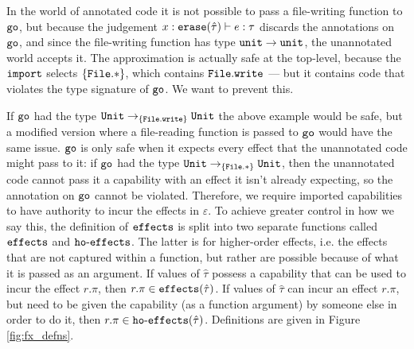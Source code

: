 In the world of annotated code it is not possible to pass a
file-writing function to $\mathtt{go}$, but because the judgement
$x: \mathtt{erase}(\hat \tau) \vdash e: \tau$ discards the annotations on
$\mathtt{go}$, and since the file-writing function has type
$\mathtt{unit} \rightarrow \mathtt{unit}$, the unannotated world accepts it. The
approximation is actually safe at the top-level, because the
$\mathtt{import}$ selects $\{ \mathtt{File.*} \}$, which contains
$\mathtt{File.write}$ --- but it contains code that violates the type
signature of $\mathtt{go}$. We want to prevent this.

If $\mathtt{go}$ had the type
$\mathtt{Unit} \rightarrow_{\{ \mathtt{File.write} \}} \mathtt{Unit}$ the above example
would be safe, but a modified version where a file-reading function is
passed to $\mathtt{go}$ would have the same issue. $\mathtt{go}$ is only
safe when it expects every effect that the unannotated code might pass
to it: if $\mathtt{go}$ had the type
$\mathtt{Unit} \rightarrow_{\{ \mathtt{File.*} \}} \mathtt{Unit}$, then the unannotated
code cannot pass it a capability with an effect it isn't already
expecting, so the annotation on $\mathtt{go}$ cannot be
violated. Therefore, we require imported capabilities to have
authority to incur the effects in $\varepsilon$. To achieve greater
control in how we say this, the definition of $\mathtt{effects}$ is split
into two separate functions called $\mathtt{effects}$ and
$\mathtt{ho \hbox{-} effects}$. The latter is for higher-order effects,
i.e. the effects that are not captured within a function, but rather
are possible because of what it is passed as an argument. If values of
$\hat \tau$ possess a capability that can be used to incur the effect
$r.\pi$, then $r.\pi \in \mathtt{effects}(\hat \tau)$. If values of $\hat \tau$ can
incur an effect $r.\pi$, but need to be given the capability (as a
function argument) by someone else in order to do it, then
$r.\pi \in \mathtt{ho \hbox{-} effects}(\hat \tau)$. Definitions are given in Figure
\ref{fig:fx_defns}.

